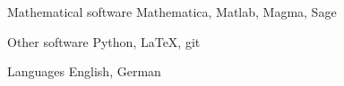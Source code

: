 

\begin{cvskills}

  \cvskill
    {Mathematical software} %
    {Mathematica, Matlab, Magma, Sage} %

  \cvskill
    {Other software} %
    {Python, {\selectfont \LaTeX}, git} %

  \cvskill
    {Languages} %
    {English, German} %

\end{cvskills}
